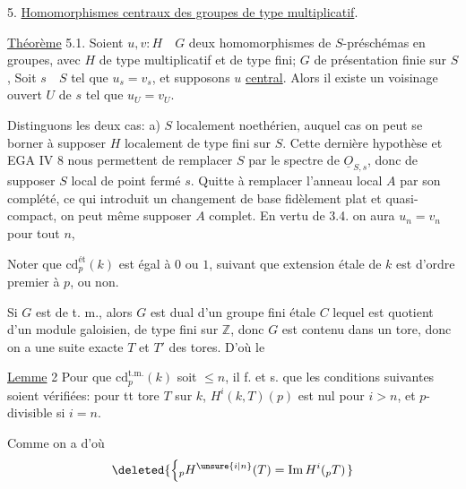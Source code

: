 5. \uline{Homomorphismes centraux des groupes de type multiplicatif}.

\uline{Théorème} 5.1. Soient $u,v:H\quad G$ deux homomorphismes de $S$-préschémas en groupes, avec $H$ de type multiplicatif et de type fini;  $G$ de présentation finie sur $S$, 
Soit $s\quad S$ tel que $u_s=v_s$, et supposons $u$ \uline{central}. Alors il existe
un voisinage ouvert $U$ de $s$ tel que $u_U=v_U$.

Distinguons les deux cas: a) $S$ localement noethérien, auquel cas
on peut se borner à supposer $H$ localement de type fini sur $S$. Cette
dernière hypothèse et EGA IV 8 nous permettent de remplacer $S$ par
le spectre de $\underline{O}_{S,s}$, donc de supposer $S$ local de point fermé $s$. Quitte
à remplacer l'anneau local $A$ par son complété, ce qui introduit un
changement de base fidèlement plat et quasi-compact, on peut même supposer $A$ complet. En vertu de 3.4. on aura $u_n=v_n$ pour tout $n$,


Noter que $\mathrm{cd}^{\text{ét}}_p(k)$ est égal à $0$ ou $1$, suivant
que  extension  étale de $k$ est d'ordre
premier à $p$, ou non.

Si $G$ est de t. m., alors $G$ est dual
d'un groupe fini étale $C$ lequel est
quotient d'un module galoisien,  de
type fini sur $\mathbb Z$, donc $G$ est contenu
dans un tore, donc on a une suite
exacte
$T$ et $T'$ des tores. D'où le

\uline{Lemme} 2 Pour que $\mathrm{cd}^{\text{t.m.}}_p(k)$ soit $\leq n$,
\margin{$\left[\rule{0pt}{6em}\right.$}
il f. et s. que les conditions suivantes
soient vérifiées: pour tt tore $T$ sur $k$,
$H^i(k,T)(p)$ est nul pour $i>n$, et $p$-divisible
si $i=n$.
\inserted{[Ou encore: pour tte extension finie \unsure{sép.} $k'$ de $k$ [\unsure{il suffit} d'ordre premier à $p$]
\deleted{$\operatorname{Br}(k)(p)$} $H^i(k',G_m)=0$ \inserted{si $i>n$, et $H^{\unsure{n}}(k',G_m)$ est $p$-divisible}]}

Comme on a
d'où
\[
\deleted{\left\{ {}_{p}H^{\unsure{i|n}}(T)=\operatorname{Im}H^i({}_{p}T)\right.}
\]

